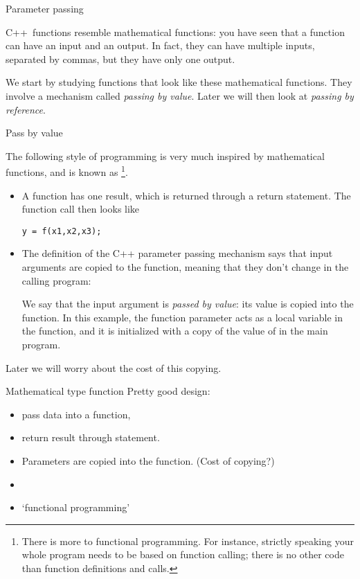  {Parameter passing}
\label{sec:passing}

C++~functions resemble mathematical functions: you have seen that a
function can have an input and an output. In fact, they can have
multiple inputs, separated by commas, but they have only one output.

We start by studying functions that look like these mathematical
functions. They involve a  mechanism
called
\emph{passing by value}.
%
Later we will then look at
\emph{passing by reference}.

 {Pass by value}

The following style of programming is very much inspired by
mathematical functions, and is known as \footnote {There is more to functional programming. For
  instance, strictly speaking your whole program needs to be based on
  function calling; there is no other code than function definitions
  and calls.}.
\begin{itemize}
\item A function has one result, which is returned through a return
  statement. The function call then looks like
\begin{verbatim}
y = f(x1,x2,x3);
\end{verbatim}
\item The definition of the C++ parameter passing mechanism says that
  input arguments are copied to the function, meaning that they don't
  change in the calling program:

  We say that the input argument is
  \emph{passed by value}: its value is
  copied into the function.
  In this example, the function parameter  acts as a local
  variable in the function, and it is initialized with a copy of the
  value of  in the main program.
\end{itemize}

Later we will worry about the cost of this copying.

\begin{slide}{Mathematical type function}
  \label{sl:func-functional}
  Pretty good design:
  \begin{itemize}
  \item pass data into a function,
  \item return result through  statement.
  \item Parameters are copied into the function. (Cost of copying?)
  \item {}
  \item `functional programming'
  \end{itemize}
\end{slide}

